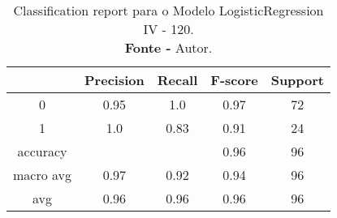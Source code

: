 % 
\begin{table}[H]
    \centering
    \begin{tabular}{@{}ccccc@{}}
    \toprule
     & \textbf{Precision} & \textbf{Recall} &\textbf{F-score} & \textbf{Support} \\ \midrule 
    0 & 0.95 & 1.0 & 0.97 & 72 \\ 
    1 & 1.0 & 0.83 & 0.91 & 24 \\ 
    accuracy &  &  & 0.96 & 96 \\ 
    macro avg & 0.97 & 0.92 & 0.94 & 96 \\ 
    avg & 0.96 & 0.96 & 0.96 & 96 \\ \bottomrule 
    \end{tabular}
    \caption{Classification report para o Modelo LogisticRegression IV - 120. \\ \textbf{Fonte -} Autor.}
    \label{tab: classification-report-Modelo LogisticRegression IV - 120}
\end{table}